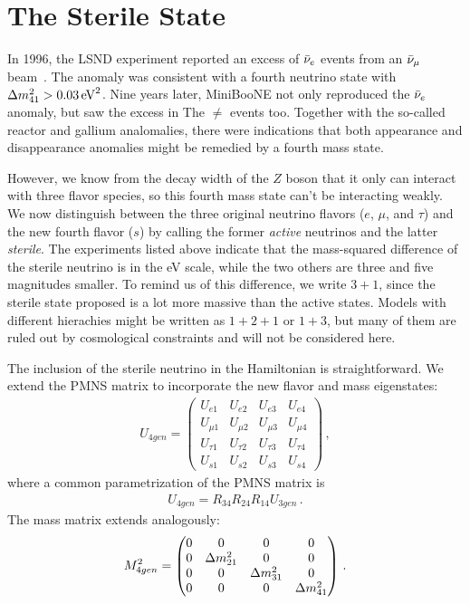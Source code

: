 \documentclass{thesis}
\begin{document}
\section{The Sterile State}\label{sec:anomalies}
In 1996, the LSND experiment reported an excess of $\bar{\nu}_e$ events from an $\bar{\nu}_\mu$ beam~\cite{lsnd}. The anomaly was consistent with a fourth
neutrino state with $\dm[41] > \SI{0.03}{\eV \squared}$. Nine years later, MiniBooNE not only reproduced the $\bar{\nu}_e$ anomaly, but saw the excess in The
$\ne$ events too. Together with the so-called reactor and gallium analomalies, there were indications that both appearance and disappearance
anomalies might be remedied by a fourth mass state.

However, we know from the decay width of the $Z$ boson that it only can interact with three flavor species, so this fourth mass state can't be interacting weakly.
We now distinguish between the three original neutrino flavors ($e$, $\mu$, and $\tau$) and the new fourth flavor ($s$) by calling the former \emph{active} neutrinos
and the latter \emph{sterile}. The experiments listed above indicate that the mass-squared difference of the sterile neutrino is in the \si{\eV} scale, while the two others
are three and five magnitudes smaller. To remind us of this difference, we write $3+1$, since the sterile state proposed is a lot more massive than the active states. Models
with different hierachies might be written as $1+2+1$ or $1+3$, but many of them are ruled out by cosmological constraints and will not be considered here. %

The inclusion of the sterile neutrino in the Hamiltonian is straightforward. We extend the PMNS matrix to incorporate the new flavor and mass eigenstates: 
\begin{align}
    U_{4gen} =
    \begin{pmatrix}
    U_{e1} & U_{e2} & U_{e3} & U_{e4} \\
    U_{\mu1} & U_{\mu2} & U_{\mu3} & U_{\mu4} \\
    U_{\tau1} & U_{\tau2} & U_{\tau3} & U_{\tau4} \\
    U_{s1} & U_{s2} & U_{s3} & U_{s4}
    \end{pmatrix}\,,
\end{align}
where a common parametrization of the PMNS matrix is 
\begin{align}\label{eq:U4gen_param}
    U_{4gen} = R_{34}R_{24}R_{14}U_{3gen}\,.
\end{align}
The mass matrix extends analogously:
\begin{align}\label{eq:dm4gen}
    M^2_{4gen} =
    \begin{pmatrix}
        0 & 0 & 0 & 0\\
        0 & \dm_{21} & 0  & 0 \\
        0 & 0 & \dm_{31} & 0 \\
        0 & 0 & 0 & \dm_{41} \\
    \end{pmatrix}\,.
\end{align}
\end{document}
